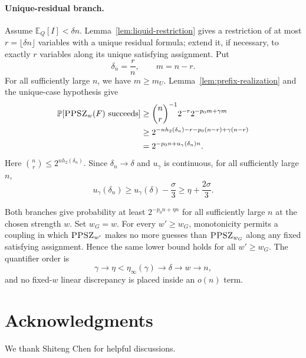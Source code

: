 \documentclass[11pt]{article}
\newcommand{\PPSZ}{\textnormal{\textsc{PPSZ}}}
\newcommand{\hbin}{h_2}
\newcommand{\E}{\mathbb E}
\newcommand{\Prb}{\mathbb P}
\begin{document}
\paragraph{Unique-residual branch.}
Assume $\E_Q[I]<\delta n$.  Lemma~\ref{lem:liquid-restriction} gives a restriction of at most $r=\lfloor\delta n\rfloor$ variables with a unique residual formula; extend it, if necessary, to exactly $r$ variables along its unique satisfying assignment.  Put
\[
 \delta_n=\frac rn,
 \qquad
 m=n-r.
\]
For all sufficiently large $n$, we have $m\ge m_U$.  Lemma~\ref{lem:prefix-realization} and the unique-case hypothesis give
\begin{align*}
 \Prb[\PPSZ_w(F)\text{ succeeds}]
 &\ge
 \binom nr^{-1}2^{-r}
 2^{-p_0m+\gamma m}\\
 &\ge
 2^{-n\hbin(\delta_n)-r-p_0(n-r)+\gamma(n-r)}\\
 &=
 2^{-p_0n+u_\gamma(\delta_n)n}.
\end{align*}
Here $\binom nr\le2^{n\hbin(\delta_n)}$.  Since $\delta_n\to\delta$ and $u_\gamma$ is continuous, for all sufficiently large $n$,
\[
 u_\gamma(\delta_n)
 \ge u_\gamma(\delta)-\frac{\sigma}{3}
 \ge\eta+\frac{2\sigma}{3}.
\]

Both branches give probability at least $2^{-p_0n+\eta n}$ for all sufficiently large $n$ at the chosen strength $w$.  Set $w_G=w$.  For every $w'\ge w_G$, monotonicity permits a coupling in which $\PPSZ_{w'}$ makes no more guesses than $\PPSZ_{w_G}$ along any fixed satisfying assignment.  Hence the same lower bound holds for all $w'\ge w_G$.  The quantifier order is
\[
 \gamma
 \longrightarrow
 \eta<\eta_\infty(\gamma)
 \longrightarrow
 \delta
 \longrightarrow
 w
 \longrightarrow
 n,
\]
and no fixed-$w$ linear discrepancy is placed inside an $o(n)$ term.

\section*{Acknowledgments}
We thank Shiteng Chen for helpful discussions.
\end{document}
